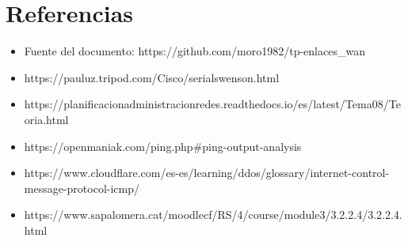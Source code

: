 \documentclass{article}
\begin{document}
\section{Referencias}
\begin{itemize}
    \item Fuente del documento: https://github.com/moro1982/tp-enlaces\_wan
    \item https://pauluz.tripod.com/Cisco/serialswenson.html 
    \item https://planificacionadministracionredes.readthedocs.io/es/latest/Tema08/Teoria.html
    \item https://openmaniak.com/ping.php#ping-output-analysis
    \item https://www.cloudflare.com/es-es/learning/ddos/glossary/internet-control-message-protocol-icmp/
    \item https://www.sapalomera.cat/moodlecf/RS/4/course/module3/3.2.2.4/3.2.2.4.html
\end{itemize} \\
\end{document}
